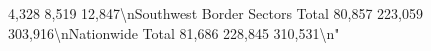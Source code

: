 \documentclass[
  12pt,
  openany]{book}
\newenvironment{Shaded}{\begin{snugshade}}{\end{snugshade}}
\begin{document}
\begin{Shaded}
\begin{Highlighting}[]
                                 4,328                     8,519                     12,847\textbackslash{}nSouthwest Border Sectors Total                  80,857                   223,059                   303,916\textbackslash{}nNationwide Total                                81,686                   228,845                   310,531\textbackslash{}n"                                                                                                                                                                                                                                                                                                                                                                                                                                                                                                                                                                                                                                                                                                                                                                                                                                                                                                                                                                                                                                                                                                                                                                                                                                                                                                                                                                                                                                                                                                                                                                                                                                                                                                                                                                                                                                                                                                                                                                                                                                                                                                                                                                                                                                                                                                                                                                                                                                                                                                                                                                                                                                                                                                                                                                                                                                                                                                                                                                                                                                                               
\end{Highlighting}
\end{Shaded}
\end{document}
